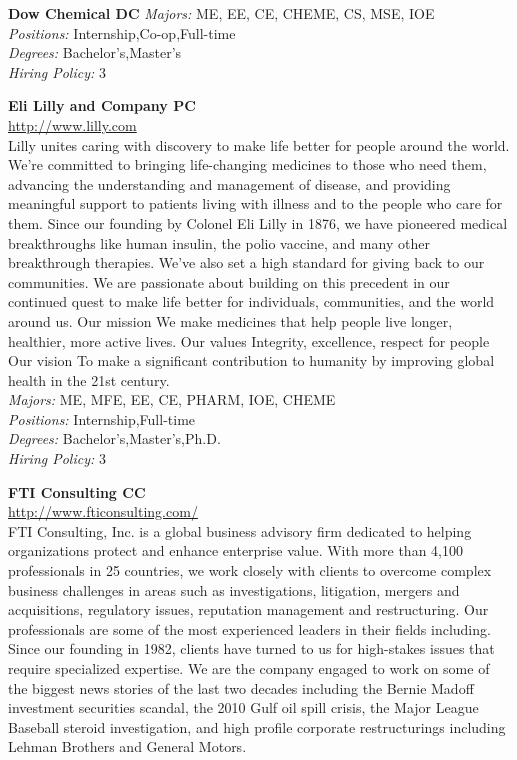 \documentclass[twoside]{article}
\begin{document}
\begin{center}
\begin{multicols}{2}
\begin{minipage}{.95\columnwidth}{\Large\bf Dow Chemical \hfill DC}
    \emph{Majors:} ME, EE, CE, CHEME, CS, MSE, IOE\\
    \emph{Positions:} Internship,Co-op,Full-time\\
    \emph{Degrees:} Bachelor's,Master's\\
    \emph{Hiring Policy:} 3\\
\end{minipage}
 \begin{minipage}{.95\columnwidth}{\Large\bf Eli Lilly and Company \hfill PC}\\
    \url{http://www.lilly.com}\\
    Lilly unites caring with discovery to make life better for people around the world. We’re committed to bringing life-changing medicines to those who need them, advancing the understanding and management of disease, and providing meaningful support to patients living with illness and to the people who care for them. Since our founding by Colonel Eli Lilly in 1876, we have pioneered medical breakthroughs like human insulin, the polio vaccine, and many other breakthrough therapies. We’ve also set a high standard for giving back to our communities. We are passionate about building on this precedent in our continued quest to make life better for individuals, communities, and the world around us. Our mission We make medicines that help people live longer, healthier, more active lives. Our values Integrity, excellence, respect for people Our vision To make a significant contribution to humanity by improving global health in the 21st century.\\
    \emph{Majors:} ME, MFE, EE, CE, PHARM, IOE, CHEME\\
    \emph{Positions:} Internship,Full-time\\
    \emph{Degrees:} Bachelor's,Master's,Ph.D.\\
    \emph{Hiring Policy:} 3\\
\end{minipage}
 \begin{minipage}{.95\columnwidth}{\Large\bf FTI Consulting \hfill CC}\\
    \url{http://www.fticonsulting.com/}\\
    FTI Consulting, Inc. is a global business advisory firm dedicated to helping organizations protect and enhance enterprise value. With more than 4,100 professionals in 25 countries, we work closely with clients to overcome complex business challenges in areas such as investigations, litigation, mergers and acquisitions, regulatory issues, reputation management and restructuring. Our professionals are some of the most experienced leaders in their fields including. Since our founding in 1982, clients have turned to us for high-stakes issues that require specialized expertise. We are the company engaged to work on some of the biggest news stories of the last two decades including the Bernie Madoff investment securities scandal, the 2010 Gulf oil spill crisis, the Major League Baseball steroid investigation, and high profile corporate restructurings including Lehman Brothers and General Motors.\\

\end{minipage}
\end{multicols}
\end{center}
\end{document}
